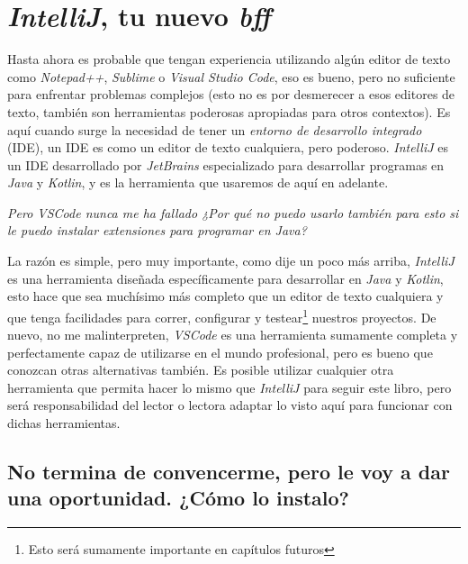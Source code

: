 \chapter{\textit{IntelliJ}, tu nuevo \textit{bff}}
  Hasta ahora es probable que tengan experiencia utilizando algún editor de texto como 
  \textit{Notepad++}, \textit{Sublime} o \textit{Visual Studio Code}, eso es bueno, pero no 
  suficiente para enfrentar problemas complejos (esto no es por desmerecer a esos editores de 
  texto, también son herramientas poderosas apropiadas para otros contextos).
  Es aquí cuando surge la necesidad de tener un \textit{entorno de desarrollo integrado} (IDE),
  un IDE es como un editor de texto cualquiera, pero poderoso.
  \textit{IntelliJ} es un IDE desarrollado por \textit{JetBrains} especializado para desarrollar
  programas en \textit{Java} y \textit{Kotlin}, y es la herramienta que usaremos de aquí en
  adelante.
  \begin{center}
    \textit{
      Pero VSCode nunca me ha fallado ¿Por qué no puedo usarlo también para esto si le puedo 
      instalar extensiones para programar en Java?
    }
  \end{center}
  
  La razón es simple, pero muy importante, como dije un poco más arriba, \textit{IntelliJ} es una
  herramienta diseñada específicamente para desarrollar en \textit{Java} y \textit{Kotlin}, esto
  hace que sea muchísimo más completo que un editor de texto cualquiera y que tenga facilidades para
  correr, configurar y testear\footnote{Esto será sumamente importante en capítulos futuros} 
  nuestros proyectos.
  De nuevo, no me malinterpreten, \textit{VSCode} es una herramienta sumamente completa y 
  perfectamente capaz de utilizarse en el mundo profesional, pero es bueno que conozcan otras 
  alternativas también.
  Es posible utilizar cualquier otra herramienta que permita hacer lo mismo que \textit{IntelliJ}
  para seguir este libro, pero será responsabilidad del lector o lectora adaptar lo visto aquí para 
  funcionar con dichas herramientas.\footnotemark


  \section{No termina de convencerme, pero le voy a dar una oportunidad. ¿Cómo lo instalo?}
\nocite{*}
